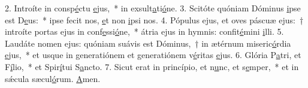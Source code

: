 2. Introíte in consp\uline{é}ctu \uline{e}jus,~* in exsult\uline{a}ti\uline{ó}ne.
3. Scitóte quóniam Dóminus \uline{i}pse est D\uline{e}us:~* ipse fecit nos, \uline{e}t non \uline{i}psi nos.
4. Pópulus ejus, et oves páscuæ ejus:~† introíte portas ejus in conf\uline{e}ssi\uline{ó}ne,~* átria ejus in hymnis: confit\uline{é}mini \uline{i}lli.
5. Laudáte nomen ejus: quóniam suávis est Dóminus,~† in ætérnum miseric\uline{ó}rdia \uline{e}jus,~* et usque in generatiónem et generatiónem v\uline{é}ritas \uline{e}jus.
6. Glória P\uline{a}tri, et F\uline{í}lio,~* et Spir\uline{í}tui S\uline{a}ncto.
7. Sicut erat in princípio, et n\uline{u}nc, et s\uline{e}mper,~* et in sǽcula sæcul\uline{ó}rum. \uline{A}men.

